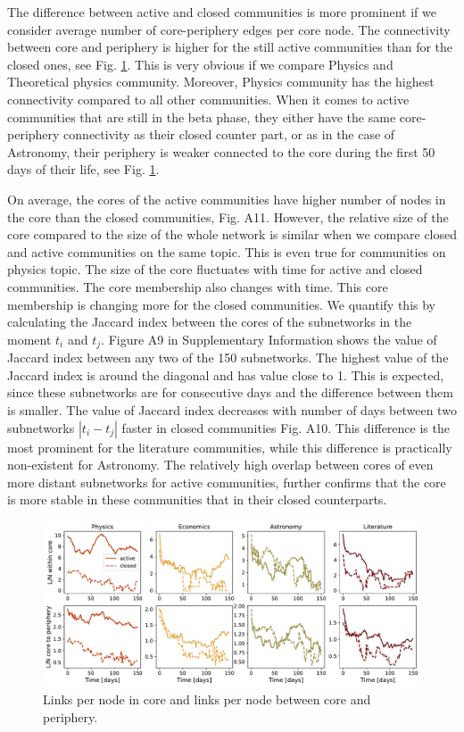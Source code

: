 The difference between active and closed communities is more prominent if we consider average number of core-periphery edges per core node. The connectivity between core and periphery is higher for the still active communities than for the closed ones, see Fig. \ref{fig:links_per_node}. This is very obvious if we compare Physics and Theoretical physics community. Moreover, Physics community has the highest connectivity compared to all other communities. When it comes to active communities that are still in the beta phase, they either have the same core-periphery connectivity as their closed counter part, or as in the case of Astronomy, their periphery is weaker connected to the core during the first 50 days of their life, see Fig. \ref{fig:links_per_node}. 

On average, the cores of the active communities have higher number of nodes in the core than the closed communities, Fig. A11. However, the relative size of the core compared to the size of the whole network is similar when we compare closed and active communities on the same topic. This is even true for communities on physics topic. The size of the core fluctuates with time for active and closed communities. The core membership also changes with time. This core membership is changing more for the closed communities. We quantify this by calculating the Jaccard index between the cores of the subnetworks in the moment $t_{i}$ and $t_{j}$. Figure A9 in Supplementary Information shows the value of Jaccard index between any two of the 150 subnetworks. The highest value of the Jaccard index is around the diagonal and has value close to 1. This is expected, since these subnetworks are for consecutive days and the difference between them is smaller. The value of Jaccard index decreases with number of days between two subnetworks $|t_{i}-t_{j}|$ faster in closed communities Fig. A10. This difference is the most prominent for the literature communities, while this difference is practically non-existent for Astronomy. The relatively high overlap between cores of even more distant subnetworks for active communities, further confirms that the core is more stable in these communities that in their closed counterparts. 


\begin{figure}
	\centering
	\includegraphics[width=\linewidth]{figures/stackexchange/core_connectivity.pdf}
	\caption{Links per node in core and links per node between core and periphery.}
	\label{fig:links_per_node}
\end{figure}


